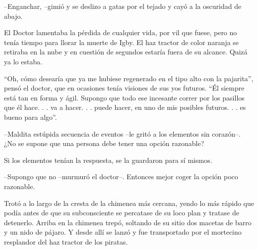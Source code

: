 --Enganchar, --gimió y se deslizo a gatas por el tejado y cayó a la oscuridad de abajo.
 
El Doctor lamentaba la pérdida de cualquier vida, por vil que fuese, pero no tenía tiempo para llorar la muerte de Igby. El haz tractor de color naranja se retiraba en la nube y en cuestión de segundos estaría fuera de su alcance. Quizá ya lo estaba.
 
``Oh, cómo desearía que ya me hubiese regenerado en el tipo alto con la pajarita'', pensó el doctor, que en ocasiones tenía visiones de sus yos futuros. ``Él siempre está tan en forma y ágil. Supongo que todo ese incesante correr por los pasillos que él hace. . . va a hacer. . . puede hacer, en uno de mis posibles futuros. . . es bueno para algo''.
 
--Maldita estúpida secuencia de eventos --le gritó a los elementos sin corazón--. ¿No se supone que una persona debe tener una opción razonable?
 
Si los elementos tenían la respuesta, se la guardaron para sí mismos.
 
--Supongo que no --murmuró el doctor--. Entonces mejor coger la opción poco razonable.

Trotó a lo largo de la cresta de la chimenea más cercana, yendo lo más rápido que podía antes de que su subconsciente se percatase de su loco plan y tratase de detenerlo. Arriba en la chimenea trepó, soltando de su sitio dos macetas de barro y un nido de pájaro. Y desde allí se lanzó y fue transportado por el mortecino resplandor del haz tractor de los piratas.
